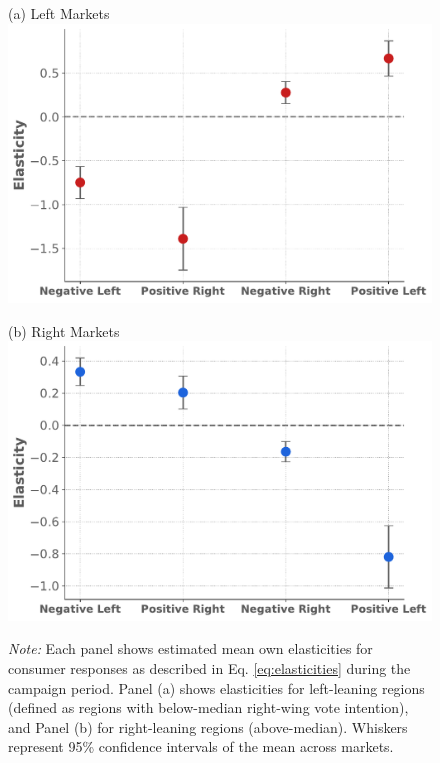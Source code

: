 \documentclass[12pt]{article}
\begin{document}
\begin{figure}[!htbp]
	 	\begin{minipage}{0.45\textwidth}
	 		\centering
	 		(a) Left Markets\\
	 		\includegraphics[width=\linewidth]{figures/elasticities_left_campaign}
	 	\end{minipage}
	 	\hfill
	 	\begin{minipage}{0.45\textwidth}
	 		\centering
	 		\vspace{1.5em}
	 		(b) Right Markets \\
	 		\includegraphics[width=\linewidth]{figures/elasticities_right_campaign}
	 		\label{fig:2figsA}
	 	\end{minipage}
	 	
	 	\vspace{0.5em} %
	 	
	 	\captionsetup{justification=justified}
	 	\caption*{\small  \textit{Note:}  Each panel shows estimated mean own elasticities for consumer responses  as described in Eq. \eqref{eq:elasticities} during the campaign period. Panel (a) shows elasticities for left-leaning regions (defined as regions with below-median right-wing vote intention), and Panel (b) for right-leaning regions (above-median). Whiskers represent 95\% confidence intervals of the mean across markets.}
	 	
	 \end{figure}
	 
\end{document}
